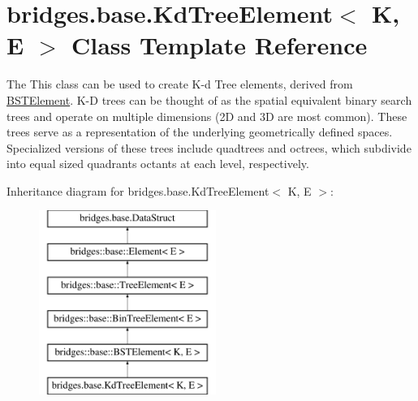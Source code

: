 \hypertarget{classbridges_1_1base_1_1_kd_tree_element}{}\section{bridges.\+base.\+Kd\+Tree\+Element$<$ K, E $>$ Class Template Reference}
\label{classbridges_1_1base_1_1_kd_tree_element}


The This class can be used to create K-\/d Tree elements, derived from \hyperlink{classbridges_1_1base_1_1_b_s_t_element}{B\+S\+T\+Element}. K-\/\+D trees can be thought of as the spatial equivalent binary search trees and operate on multiple dimensions (2\+D and 3\+D are most common). These trees serve as a representation of the underlying geometrically defined spaces. Specialized versions of these trees include quadtrees and octrees, which subdivide into equal sized quadrants octants at each level, respectively.  


Inheritance diagram for bridges.\+base.\+Kd\+Tree\+Element$<$ K, E $>$\+:\begin{figure}[H]
\begin{center}
\leavevmode
\includegraphics[height=6.000000cm]{classbridges_1_1base_1_1_kd_tree_element}
\end{center}
\end{figure}
